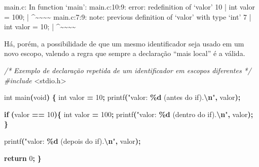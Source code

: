 \documentclass[
  11pt,
  a4paper,
]{scrbook}
\newenvironment{Shaded}{\begin{snugshade}}{\end{snugshade}}
\newcommand{\CommentTok}[1]{\textcolor[rgb]{0.56,0.35,0.01}{\textit{#1}}}
\newcommand{\ControlFlowTok}[1]{\textcolor[rgb]{0.13,0.29,0.53}{\textbf{#1}}}
\newcommand{\DataTypeTok}[1]{\textcolor[rgb]{0.13,0.29,0.53}{#1}}
\newcommand{\DecValTok}[1]{\textcolor[rgb]{0.00,0.00,0.81}{#1}}
\newcommand{\ImportTok}[1]{#1}
\newcommand{\NormalTok}[1]{#1}
\newcommand{\OperatorTok}[1]{\textcolor[rgb]{0.81,0.36,0.00}{\textbf{#1}}}
\newcommand{\PreprocessorTok}[1]{\textcolor[rgb]{0.56,0.35,0.01}{\textit{#1}}}
\newcommand{\SpecialCharTok}[1]{\textcolor[rgb]{0.81,0.36,0.00}{\textbf{#1}}}
\newcommand{\StringTok}[1]{\textcolor[rgb]{0.31,0.60,0.02}{#1}}
\begin{document}
\begin{Shaded}
\begin{Highlighting}[]
\NormalTok{main.c: In function ‘main’:}
\NormalTok{main.c:10:9: error: redefinition of ‘valor’}
\NormalTok{   10 |     int valor = 100;}
\NormalTok{      |         \^{}\textasciitilde{}\textasciitilde{}\textasciitilde{}\textasciitilde{}}
\NormalTok{main.c:7:9: note: previous definition of ‘valor’ with type ‘int’}
\NormalTok{    7 |     int valor = 10;}
\NormalTok{      |         \^{}\textasciitilde{}\textasciitilde{}\textasciitilde{}\textasciitilde{}}
\end{Highlighting}
\end{Shaded}

Há, porém, a possibilidade de que um mesmo identificador seja usado em
um novo escopo, valendo a regra que sempre a declaração ``mais local'' é
a válida.

\begin{Shaded}
\begin{Highlighting}[]
\CommentTok{/*}
\CommentTok{Exemplo de declaração repetida de um identificador em escopos diferentes}
\CommentTok{*/}
\PreprocessorTok{\#include }\ImportTok{\textless{}stdio.h\textgreater{}}

\DataTypeTok{int}\NormalTok{ main}\OperatorTok{(}\DataTypeTok{void}\OperatorTok{)} \OperatorTok{\{}
    \DataTypeTok{int}\NormalTok{ valor }\OperatorTok{=} \DecValTok{10}\OperatorTok{;}
\NormalTok{    printf}\OperatorTok{(}\StringTok{"valor: }\SpecialCharTok{\%d}\StringTok{ (antes do if).}\SpecialCharTok{\textbackslash{}n}\StringTok{"}\OperatorTok{,}\NormalTok{ valor}\OperatorTok{);}
    
    \ControlFlowTok{if} \OperatorTok{(}\NormalTok{valor }\OperatorTok{==} \DecValTok{10}\OperatorTok{)\{}
        \DataTypeTok{int}\NormalTok{ valor }\OperatorTok{=} \DecValTok{100}\OperatorTok{;}
\NormalTok{        printf}\OperatorTok{(}\StringTok{"valor: }\SpecialCharTok{\%d}\StringTok{ (dentro do if).}\SpecialCharTok{\textbackslash{}n}\StringTok{"}\OperatorTok{,}\NormalTok{ valor}\OperatorTok{);}
    \OperatorTok{\}}

\NormalTok{    printf}\OperatorTok{(}\StringTok{"valor: }\SpecialCharTok{\%d}\StringTok{ (depois do if).}\SpecialCharTok{\textbackslash{}n}\StringTok{"}\OperatorTok{,}\NormalTok{ valor}\OperatorTok{);}

    \ControlFlowTok{return} \DecValTok{0}\OperatorTok{;}
\OperatorTok{\}}
\end{Highlighting}
\end{Shaded}
\end{document}
